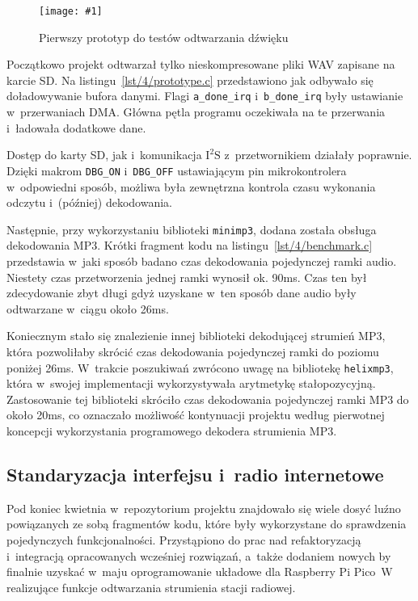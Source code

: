 \documentclass[polish]{aghengthesis}
\newcommand{\imgint}[4]{
	\begin{figure}[{#4}]
		\centering
		\texttt{[image: \#1]}
		\caption{#2}
		\label{#1}
	\end{figure}
}
\newcommand{\imgh}[3]{\imgint{#1}{#2}{#3}{H}}
\newcommand{\isqs}{$\text{I}^{2}\text{S}$}
\newcommand{\lstfile}[3]{
	\noindent
	\hspace{0.1\linewidth}
	\begin{minipage}{0.8\linewidth}
		
	\end{minipage}
	\vspace{0.3cm}
}
\begin{document}
			\imgh{4/prototype_1}{Pierwszy prototyp do testów odtwarzania dźwięku}{0.6}
			
			Początkowo projekt odtwarzał tylko nieskompresowane pliki WAV zapisane na karcie SD. Na listingu~\ref{lst/4/prototype.c} przedstawiono jak odbywało się doładowywanie bufora danymi. Flagi \lstinline|a_done_irq| i~\lstinline|b_done_irq| były ustawianie w~przerwaniach DMA. Główna pętla programu oczekiwała na te przerwania i~ładowała dodatkowe dane.
			
			\lstfile{c}{Realizacja podstawowego ładowania bufora}{lst/4/prototype.c}
			
			Dostęp do karty SD, jak i~komunikacja \isqs{} z~przetwornikiem działały poprawnie. Dzięki makrom \lstinline|DBG_ON| i~\lstinline|DBG_OFF| ustawiającym pin mikrokontrolera w~odpowiedni sposób, możliwa była zewnętrzna kontrola czasu wykonania odczytu i~(później) dekodowania.
			\pagebreak
			
			Następnie, przy wykorzystaniu biblioteki \lstinline|minimp3|\textsuperscript{\cite{minimp3}}, dodana została obsługa dekodowania MP3. Krótki fragment kodu na listingu~\ref{lst/4/benchmark.c} przedstawia w~jaki sposób badano czas dekodowania pojedynczej ramki audio. Niestety czas przetworzenia jednej ramki wynosił ok. 90ms.
			Czas ten był zdecydowanie zbyt długi gdyż uzyskane w~ten sposób dane audio  były odtwarzane w~ciągu około 26ms.

			\lstfile{c}{Pomiar czasu dekodowania ramki MP3}{lst/4/benchmark.c}
			
			Koniecznym stało się znalezienie innej biblioteki dekodującej strumień MP3, która pozwoliłaby skrócić czas dekodowania pojedynczej ramki do poziomu poniżej 26ms. W~trakcie poszukiwań zwrócono uwagę na bibliotekę \lstinline|helixmp3|, która w~swojej implementacji wykorzystywała arytmetykę stałopozycyjną. Zastosowanie tej biblioteki skróciło czas dekodowania pojedynczej ramki MP3 do około 20ms, co oznaczało możliwość kontynuacji projektu według pierwotnej koncepcji wykorzystania programowego dekodera strumienia MP3.
			
		\subsection{Standaryzacja interfejsu i~radio internetowe}
			Pod koniec kwietnia w~repozytorium projektu znajdowało się wiele dosyć luźno powiązanych ze sobą fragmentów kodu, które były wykorzystane do sprawdzenia pojedynczych funkcjonalności.
			Przystąpiono do prac nad refaktoryzacją i~integracją opracowanych wcześniej rozwiązań, a~także dodaniem nowych by finalnie uzyskać w~maju oprogramowanie układowe dla Raspberry Pi Pico~W realizujące funkcje odtwarzania strumienia stacji radiowej.
			$ $\\
			
\end{document}
